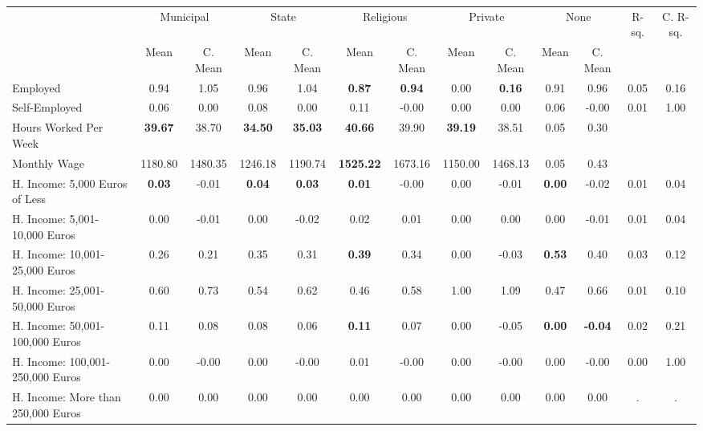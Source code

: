 \begin{tabular}{l c c c c c c c c c c c c}
\toprule
& \multicolumn{2}{c}{Municipal} & \multicolumn{2}{c}{State} & \multicolumn{2}{c}{Religious} & \multicolumn{2}{c}{Private} & \multicolumn{2}{c}{None} & R-sq. & C. R-sq. \\
& \scriptsize Mean & \scriptsize C. Mean & \scriptsize Mean & \scriptsize C. Mean & \scriptsize Mean & \scriptsize C. Mean & \scriptsize Mean & \scriptsize C. Mean & \scriptsize Mean & \scriptsize C. Mean & & \\
\midrule
Employed &      0.94 & 1.05 &      0.96 & 1.04 & \textbf{     0.87} & \textbf{     0.94} &      0.00 & \textbf{     0.16} &      0.91 & 0.96 &      0.05 &      0.16 \\
Self-Employed &      0.06 & 0.00 &      0.08 & 0.00 &      0.11 & -0.00 &      0.00 & 0.00 &      0.06 & -0.00 &      0.01 &      1.00 \\
Hours Worked Per Week & \textbf{    39.67} & 38.70 & \textbf{    34.50} & \textbf{    35.03} & \textbf{    40.66} & 39.90 & \textbf{    39.19} & 38.51 &      0.05 &      0.30 \\
Monthly Wage &   1180.80 & 1480.35 &   1246.18 & 1190.74 & \textbf{  1525.22} & 1673.16 &   1150.00 & 1468.13 &      0.05 &      0.43 \\
H. Income: 5,000 Euros of Less & \textbf{     0.03} & -0.01 & \textbf{     0.04} & \textbf{     0.03} & \textbf{     0.01} & -0.00 &      0.00 & -0.01 & \textbf{     0.00} & -0.02 &      0.01 &      0.04 \\
H. Income: 5,001-10,000 Euros &      0.00 & -0.01 &      0.00 & -0.02 &      0.02 & 0.01 &      0.00 & 0.00 &      0.00 & -0.01 &      0.01 &      0.04 \\
H. Income: 10,001-25,000 Euros &      0.26 & 0.21 &      0.35 & 0.31 & \textbf{     0.39} & 0.34 &      0.00 & -0.03 & \textbf{     0.53} & 0.40 &      0.03 &      0.12 \\
H. Income: 25,001-50,000 Euros &      0.60 & 0.73 &      0.54 & 0.62 &      0.46 & 0.58 &      1.00 & 1.09 &      0.47 & 0.66 &      0.01 &      0.10 \\
H. Income: 50,001-100,000 Euros &      0.11 & 0.08 &      0.08 & 0.06 & \textbf{     0.11} & 0.07 &      0.00 & -0.05 & \textbf{     0.00} & \textbf{    -0.04} &      0.02 &      0.21 \\
H. Income: 100,001-250,000 Euros &      0.00 & -0.00 &      0.00 & -0.00 &      0.01 & -0.00 &      0.00 & -0.00 &      0.00 & -0.00 &      0.00 &      1.00 \\
H. Income: More than 250,000 Euros &      0.00 & 0.00 &      0.00 & 0.00 &      0.00 & 0.00 &      0.00 & 0.00 &      0.00 & 0.00 &         . &         . \\
\bottomrule
\end{tabular}

